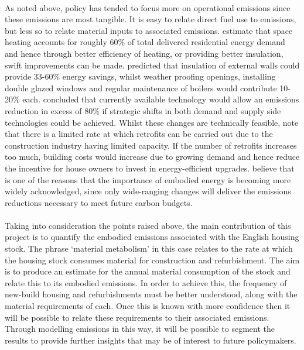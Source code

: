 \documentclass[12pt]{article}
\begin{document}
\paragraph{}
As noted above, policy has tended to focus more on operational emissions since these emissions are most tangible. It is easy to relate direct fuel use to emissions, but less so to relate material inputs to associated emissions. \citet{Crosbie2010-gz} estimate that space heating accounts for roughly 60\% of total delivered residential energy demand and hence through better efficiency of heating, or providing better insulation, swift improvements can be made. \citet{Balaras2007-eq} predicted that insulation of external walls could provide 33-60\% energy savings, whilst weather proofing openings, installing double glazed windows and regular maintenance of boilers would contribute 10-20\% each. \citet{Johnston2005-da} concluded that currently available technology would allow an emissions reduction in excess of 80\% if strategic shifts in both demand and supply side technologies could be achieved. Whilst these changes are technically feasible, \citet{Hens2001-fo} note that there is a limited rate at which retrofits can be carried out due to the construction industry having limited capacity. If the number of retrofits increases too much, building costs would increase due to growing demand and hence reduce the incentive for house owners to invest in energy-efficient upgrades. \citet{Koezjakov2018-qw} believe that is one of the reasons that the importance of embodied energy is becoming more widely acknowledged, since only wide-ranging changes will deliver the emissions reductions necessary to meet future carbon budgets.

\paragraph{}
Taking into consideration the points raised above, the main contribution of this project is to quantify the embodied emissions associated with the English housing stock. The phrase `material metabolism' in this case relates to the rate at which the housing stock consumes material for construction and refurbishment. The aim is to produce an estimate for the annual material consumption of the stock and relate this to its embodied emissions. In order to achieve this, the frequency of new-build housing and refurbishments must be better understood, along with the material requirements of each. Once this is known with more confidence then it will be possible to relate these requirements to their associated emissions. Through modelling emissions in this way, it will be possible to segment the results to provide further insights that may be of interest to future policymakers.
\end{document}
